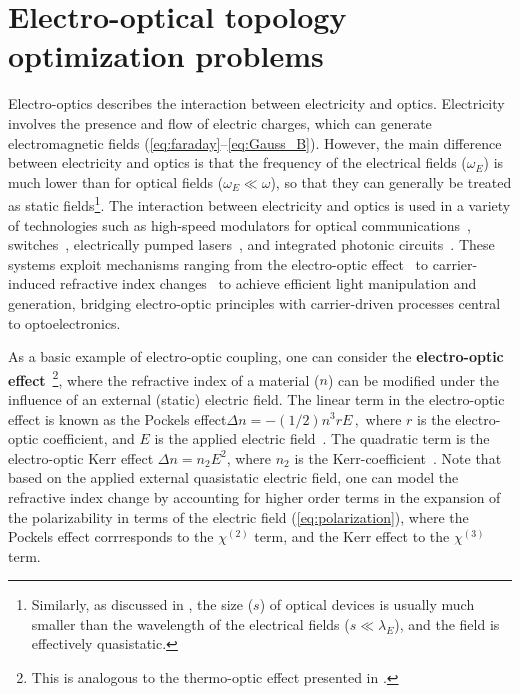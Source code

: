 \chapter{Electro-optical topology optimization problems}\label{chap:eo}
Electro-optics describes the interaction between electricity and optics. Electricity involves the presence and flow of electric charges, which can generate electromagnetic fields (\eqref{eq:faraday}--\eqref{eq:Gauss_B}).
However, the main difference between electricity and optics is that the frequency of the electrical fields ($\omega_E$)
is much lower than for optical fields ($\omega_E \ll \omega $), so that they can generally be treated as static fields\footnote{Similarly, as discussed in , the size ($s$) of optical devices
is usually much smaller than the wavelength of the electrical fields ($s\ll \lambda_E $), and the field is effectively quasistatic.}.
The interaction between electricity and optics is used in a variety of technologies such as high-speed modulators for optical communications~\cite{modu, modu1, modu2, pockels}, switches~\cite{eo_switch}, electrically pumped lasers~\cite{laser,laser_pic}, and integrated photonic circuits~\cite{laser_pic}. 
These systems exploit mechanisms ranging from the electro-optic effect~\cite{eo_effect} to carrier-induced refractive index
 changes~\cite{c_i_n} to achieve efficient light manipulation and generation, bridging electro-optic principles with carrier-driven processes central to optoelectronics.

As a basic example of electro-optic coupling, one can consider the \textbf{electro-optic effect}~\cite{eo_effect}\footnote{This is analogous to the thermo-optic effect presented in .},
where the refractive index of a material ($n$) can be modified under the influence of an external (static) electric field. The linear term in the electro-optic effect is known as the
Pockels effect$
    \Delta n = -(1/2) n^3 r E\,,$
where $r$ is the electro-optic coefficient, and $E$ is the applied electric field~\cite{pockels}. The quadratic term 
is the electro-optic Kerr effect $\Delta n = n_2 E^2$, where $n_2$ is the Kerr-coefficient~\cite{phot_crys}. Note that based on the applied external
quasistatic electric field, one can model the refractive index change by accounting for higher order terms in the expansion of the polarizability
in terms of the electric field (\eqref{eq:polarization}), where the Pockels effect corrresponds to the $\chi^{(2)}$ term, and the Kerr effect to the $\chi^{(3)}$ term.

